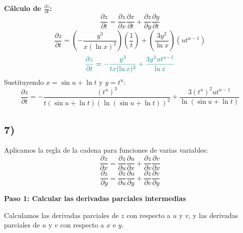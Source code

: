 \documentclass{article}
\begin{document}
\textbf{Cálculo de $\frac{\partial z}{\partial t}$:}
\[
\frac{\partial z}{\partial t} = \frac{\partial z}{\partial x} \frac{\partial x}{\partial t} + \frac{\partial z}{\partial y} \frac{\partial y}{\partial t}
\]
\[
\frac{\partial z}{\partial t} = \left( -\frac{y^3}{x (\ln x)^2} \right) \left( \frac{1}{t} \right) + \left( \frac{3y^2}{\ln x} \right) (u t^{u-1})
\]
\[\color{teal}
\frac{\partial z}{\partial t} = -\frac{y^3}{t x (\ln x)^2} + \frac{3y^2 u t^{u-1}}{\ln x}
\]
Sustituyendo $x = \sin u + \ln t$ y $y = t^u$:
\[
\frac{\partial z}{\partial t} = -\frac{(t^u)^3}{t (\sin u + \ln t) (\ln(\sin u + \ln t))^2} + \frac{3(t^u)^2 u t^{u-1}}{\ln(\sin u + \ln t)}
\]

\subsection*{7)}


Aplicamos la regla de la cadena para funciones de varias variables:
\[
\frac{\partial z}{\partial x} = \frac{\partial z}{\partial u} \frac{\partial u}{\partial x} + \frac{\partial z}{\partial v} \frac{\partial v}{\partial x}
\]
\[
\frac{\partial z}{\partial y} = \frac{\partial z}{\partial u} \frac{\partial u}{\partial y} + \frac{\partial z}{\partial v} \frac{\partial v}{\partial y}
\]

\vspace{1em}

\textbf{Paso 1: Calcular las derivadas parciales intermedias}

Calculamos las derivadas parciales de $z$ con respecto a $u$ y $v$, y las derivadas parciales de $u$ y $v$ con respecto a $x$ e $y$.
\end{document}
